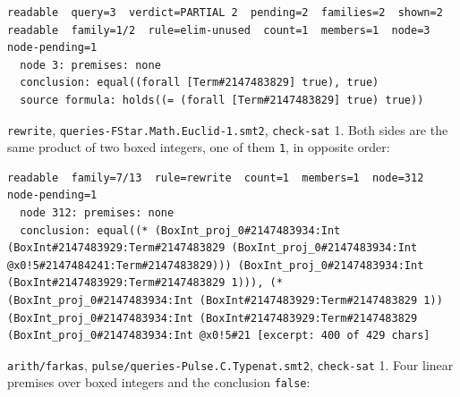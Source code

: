 \documentclass[10pt,a4paper]{article}
\begin{document}
\begin{lstlisting}[basicstyle=\ttfamily\footnotesize,breaklines=true,breakatwhitespace=false,columns=fullflexible,keepspaces=true,showstringspaces=false,breakindent=1.5em,postbreak=\mbox{\textcolor{gray}{$\hookrightarrow$}\space},frame=single,rulecolor=\color{lightgray},xleftmargin=2pt,xrightmargin=2pt,aboveskip=6pt,belowskip=6pt]
readable  query=3  verdict=PARTIAL 2  pending=2  families=2  shown=2
readable  family=1/2  rule=elim-unused  count=1  members=1  node=3  node-pending=1
  node 3: premises: none
  conclusion: equal((forall [Term#2147483829] true), true)
  source formula: holds((= (forall [Term#2147483829] true) true))
\end{lstlisting}

\texttt{rewrite}, \texttt{queries-{}\allowbreak{}FStar.\allowbreak{}Math.\allowbreak{}Euclid-{}\allowbreak{}1.\allowbreak{}smt2}, \texttt{check-{}\allowbreak{}sat} 1. Both sides are the same product of two boxed integers, one of them \texttt{1}, in opposite order:

\begin{lstlisting}[basicstyle=\ttfamily\footnotesize,breaklines=true,breakatwhitespace=false,columns=fullflexible,keepspaces=true,showstringspaces=false,breakindent=1.5em,postbreak=\mbox{\textcolor{gray}{$\hookrightarrow$}\space},frame=single,rulecolor=\color{lightgray},xleftmargin=2pt,xrightmargin=2pt,aboveskip=6pt,belowskip=6pt]
readable  family=7/13  rule=rewrite  count=1  members=1  node=312  node-pending=1
  node 312: premises: none
  conclusion: equal((* (BoxInt_proj_0#2147483934:Int (BoxInt#2147483929:Term#2147483829 (BoxInt_proj_0#2147483934:Int @x0!5#2147484241:Term#2147483829))) (BoxInt_proj_0#2147483934:Int (BoxInt#2147483929:Term#2147483829 1))), (* (BoxInt_proj_0#2147483934:Int (BoxInt#2147483929:Term#2147483829 1)) (BoxInt_proj_0#2147483934:Int (BoxInt#2147483929:Term#2147483829 (BoxInt_proj_0#2147483934:Int @x0!5#21 [excerpt: 400 of 429 chars]
\end{lstlisting}

\texttt{arith/\allowbreak{}farkas}, \texttt{pulse/\allowbreak{}queries-{}\allowbreak{}Pulse.\allowbreak{}C.\allowbreak{}Typenat.\allowbreak{}smt2}, \texttt{check-{}\allowbreak{}sat} 1. Four linear premises over boxed integers and the conclusion \texttt{false}:
\end{document}
